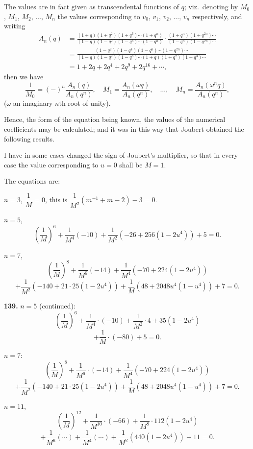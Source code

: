 \documentclass[11pt,a4paper]{article}
\theoremstyle{plain}
\begin{document}
The values are in fact given as transcendental functions of $q$; viz.\ denoting by $M_0$, $M_1$, $M_2$, $\ldots$, $M_n$ the values corresponding to $v_0$, $v_1$, $v_2$, $\ldots$, $v_n$ respectively, and writing
\begin{align*}
A_n(q) &= \frac{(1 + q)(1 + q^2)(1 + q^3)\cdots(1 + q^n)}{(1 - q)(1 - q^2)(1 - q^3)\cdots(1 - q^n)} \cdot \frac{(1 + q^n)(1 + q^{2n})\cdots}{(1 - q^n)(1 - q^{2n})\cdots} \\
&= \frac{(1 - q^2)(1 - q^4)(1 - q^6)\cdots(1 - q^{2n})\cdots}{(1 - q)(1 - q^2)(1 - q^3)\cdots(1 + q)(1 + q^2)(1 + q^3)\cdots} \\
&= 1 + 2q + 2q^4 + 2q^9 + 2q^{16} + \cdots,
\end{align*}
then we have
\[
\frac{1}{M_0} = (-)^n \frac{A_n(q)}{A_n(q^n)}, \quad
M_1 = \frac{A_n(\omega q)}{A_n(q^n)}, \quad \ldots, \quad
M_n = \frac{A_n(\omega^n q)}{A_n(q^n)},
\]
($\omega$ an imaginary $n$th root of unity).

Hence, the form of the equation being known, the values of the numerical coefficients may be calculated; and it was in this way that Joubert obtained the following results.

I have in some cases changed the sign of Joubert's multiplier, so that in every case the value corresponding to $u = 0$ shall be $M = 1$.

The equations are:

$n = 3$, $\dfrac{1}{M} = 0$, this is $\dfrac{1}{M^2}(m^{-1} + m - 2) - 3 = 0$.

\medskip
$n = 5$,
\[
\left(\frac{1}{M}\right)^6 + \frac{1}{M^4}(-10) + \frac{1}{M^2}(-26 + 256(1 - 2u^4)) + 5 = 0.
\]

\medskip
$n = 7$,
\[
\left(\frac{1}{M}\right)^8 + \frac{1}{M^6}(-14) + \frac{1}{M^4}(-70 + 224(1 - 2u^4))
\]
\[
+ \frac{1}{M^2}(-140 + 21 \cdot 25(1 - 2u^4)) + \frac{1}{M}(48 + 2048u^4(1 - u^4)) + 7 = 0.
\]


\noindent\textbf{139.} $n = 5$ (continued):
\[
\left(\frac{1}{M}\right)^6 + \frac{1}{M^4} \cdot (-10) + \frac{1}{M^2} \cdot 4 + 35(1 - 2u^4)
\]
\[
+ \frac{1}{M} \cdot (-80) + 5 = 0.
\]

$n = 7$:
\[
\left(\frac{1}{M}\right)^8 + \frac{1}{M^6} \cdot (-14) + \frac{1}{M^4}(-70 + 224(1 - 2u^4))
\]
\[
+ \frac{1}{M^2}(-140 + 21 \cdot 25(1 - 2u^4)) + \frac{1}{M}(48 + 2048u^4(1 - u^4)) + 7 = 0.
\]

$n = 11$,
\[
\left(\frac{1}{M}\right)^{12} + \frac{1}{M^{10}} \cdot (-66) + \frac{1}{M^8} \cdot 112(1 - 2u^4)
\]
\[
+ \frac{1}{M^6}(\cdots) + \frac{1}{M^4}(\cdots) + \frac{1}{M^2}(440(1 - 2u^4)) + 11 = 0.
\]
\end{document}
